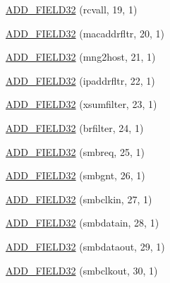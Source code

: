 \begin{DoxyCompactItemize}
\hyperlink{structiGbReg_1_1Regs_1_1MANC_aedede06fb58e6c3f070d1198a9e66fe9}{ADD\_\-FIELD32} (rcvall, 19, 1)
\item 
\hyperlink{structiGbReg_1_1Regs_1_1MANC_a63df611ee3fee21c2369743b412e0cae}{ADD\_\-FIELD32} (macaddrfltr, 20, 1)
\item 
\hyperlink{structiGbReg_1_1Regs_1_1MANC_a91da46f3c0b1b06dd4819817898c6b9f}{ADD\_\-FIELD32} (mng2host, 21, 1)
\item 
\hyperlink{structiGbReg_1_1Regs_1_1MANC_a9a614d94d8ea1d1d001ffe67e2130654}{ADD\_\-FIELD32} (ipaddrfltr, 22, 1)
\item 
\hyperlink{structiGbReg_1_1Regs_1_1MANC_a0c4f1a4cf2aa30bfbf738ae989f9d240}{ADD\_\-FIELD32} (xsumfilter, 23, 1)
\item 
\hyperlink{structiGbReg_1_1Regs_1_1MANC_ae09f32cfeac6965b3a1d65ba8b43da6d}{ADD\_\-FIELD32} (brfilter, 24, 1)
\item 
\hyperlink{structiGbReg_1_1Regs_1_1MANC_a7d1ab7de90f4d80a9881af1eb62f7df5}{ADD\_\-FIELD32} (smbreq, 25, 1)
\item 
\hyperlink{structiGbReg_1_1Regs_1_1MANC_ae5b2aa1c18d2a953ecb13bcc542eebe2}{ADD\_\-FIELD32} (smbgnt, 26, 1)
\item 
\hyperlink{structiGbReg_1_1Regs_1_1MANC_af9e434040ab2b218622638d90560a662}{ADD\_\-FIELD32} (smbclkin, 27, 1)
\item 
\hyperlink{structiGbReg_1_1Regs_1_1MANC_a55e9290e6a16b8e54787b2c9728c8021}{ADD\_\-FIELD32} (smbdatain, 28, 1)
\item 
\hyperlink{structiGbReg_1_1Regs_1_1MANC_ab91746246007a20ff71ffe80e6ca0f55}{ADD\_\-FIELD32} (smbdataout, 29, 1)
\item 
\hyperlink{structiGbReg_1_1Regs_1_1MANC_a1f53c79761158448fd42a1725d3de3c4}{ADD\_\-FIELD32} (smbclkout, 30, 1)
\end{DoxyCompactItemize}


